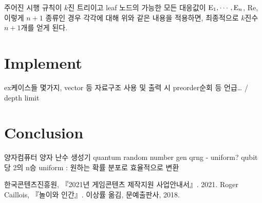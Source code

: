 \documentclass[11pt]{article}
\begin{document}
주어진 시행 규칙이 $k$진 트리이고 leaf 노드의 가능한 모든 대응값이 $\textnormal{E}_{1}, \cdots, \textnormal{E}_{n}$, Re, 이렇게 $n+1$ 종류인 경우 각각에 대해 위와 같은 내용을 적용하면, 최종적으로 $k$진수 $n+1$개를 얻게 된다.



\section{Implement}

ex케이스들 몇가지, vector 등 자료구조 사용 및 출력 시 preorder순회 등 언급… / depth limit

\section{Conclusion}
양자컴퓨터 양자 난수 생성기
quantum random number gen qrng - uniform?
qubit 당 2의 n승 uniform : 원하는 확률 분포로 효율적으로 변환

\begin{thebibliography}{99}
한국콘텐츠진흥원, 『2021년 게임콘텐츠 제작지원 사업안내서』. 2021.
Roger Caillois, 『놀이와 인간』. 이상률 옮김, 문예출판사, 2018.

\end{thebibliography}
\end{document}
